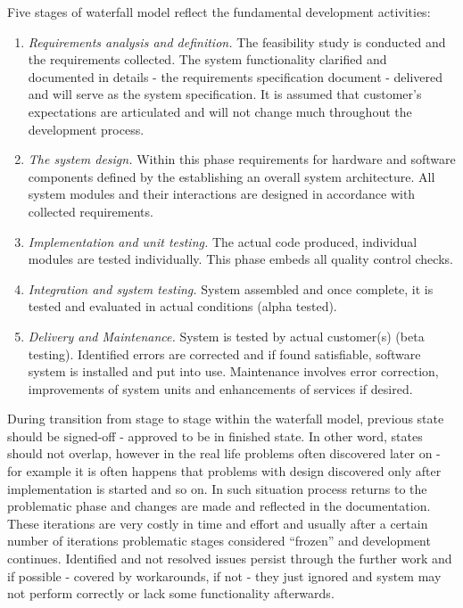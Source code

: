 Five stages of waterfall model reflect the fundamental development activities:
\begin{enumerate}
 \item \textit{Requirements analysis and definition.} The feasibility study 
is conducted 
and the requirements collected. The system functionality clarified and
documented in details - the requirements specification document - delivered  
and will serve as the system specification. It is assumed that customer's 
expectations are articulated and will not change much throughout the development 
process.
 \item \textit{The system design.} Within this phase requirements for hardware and 
software components defined by the establishing an overall system architecture.
All system modules and their interactions are designed in accordance with 
collected requirements.
 \item \textit{Implementation and unit testing.} The actual code produced, individual 
modules are tested individually. This phase embeds all quality control checks.
 \item \textit{Integration and system testing.} System assembled and once complete, it
is tested and evaluated in actual conditions (alpha tested).
 \item \textit{Delivery and Maintenance.} System is tested by actual customer(s) 
(beta testing). Identified errors are corrected and if found satisfiable, 
software system is installed and put into use. Maintenance involves error correction, 
improvements of system units and enhancements of services if desired.
\end{enumerate}

During transition from stage to stage within the waterfall model, previous state 
should be signed-off - approved to be in finished state. In other 
word, states should not overlap, however in the real life problems often discovered
later on - for example it is often happens that problems with design 
discovered only after implementation is started and so on. In such situation
process returns to the problematic phase and changes are made and reflected in 
the documentation. These iterations are very costly in time and effort and 
usually after a certain number of iterations problematic stages considered 
``frozen'' and development continues. Identified and not resolved issues persist
through the further work and if possible - covered by workarounds, if not - 
they just ignored and system may not perform correctly or lack some functionality 
afterwards.

